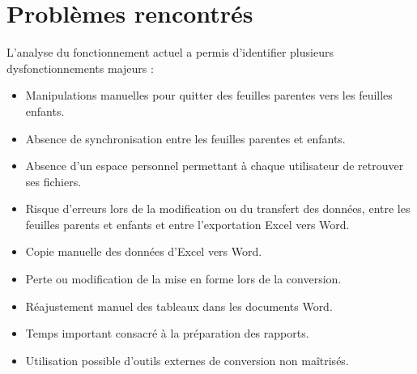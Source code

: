 \chapter{Problèmes rencontrés}

L'analyse du fonctionnement actuel a permis d'identifier plusieurs dysfonctionnements majeurs :

\begin{itemize}
    \item Manipulations manuelles pour quitter des feuilles parentes vers les feuilles enfants.
    \item Absence de synchronisation entre les feuilles parentes et enfants.
    \item Absence d'un espace personnel permettant à chaque utilisateur de retrouver ses fichiers.
    \item Risque d'erreurs lors de la modification ou du transfert des données, entre les feuilles parents et enfants et entre l'exportation Excel vers Word.
    \item Copie manuelle des données d'Excel vers Word.
    \item Perte ou modification de la mise en forme lors de la conversion.
    \item Réajustement manuel des tableaux dans les documents Word.
    \item Temps important consacré à la préparation des rapports.
    \item Utilisation possible d'outils externes de conversion non maîtrisés.
\end{itemize}
